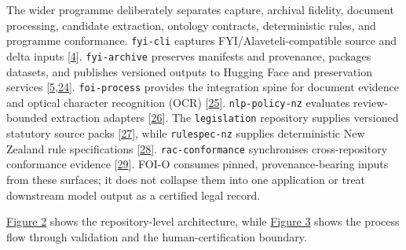 \documentclass[
]{article}
\begin{document}
The wider programme deliberately separates capture, archival fidelity,
document processing, candidate extraction, ontology contracts,
deterministic rules, and programme conformance. \texttt{fyi-cli}
captures FYI/Alaveteli-compatible source and delta inputs {[}\hyperlink{ref-4}{4}{]}.
\texttt{fyi-archive} preserves manifests and provenance, packages
datasets, and publishes versioned outputs to Hugging Face and
preservation services {[}\hyperlink{ref-5}{5},\hyperlink{ref-24}{24}{]}. \texttt{foi-process} provides the
integration spine for document evidence and optical character
recognition (OCR) {[}\hyperlink{ref-25}{25}{]}. \texttt{nlp-policy-nz} evaluates
review-bounded extraction adapters {[}\hyperlink{ref-26}{26}{]}. The \texttt{legislation}
repository supplies versioned statutory source packs {[}\hyperlink{ref-27}{27}{]}, while
\texttt{rulespec-nz} supplies deterministic New Zealand rule
specifications {[}\hyperlink{ref-28}{28}{]}. \texttt{rac-conformance} synchronises
cross-repository conformance evidence {[}\hyperlink{ref-29}{29}{]}. FOI-O consumes pinned,
provenance-bearing inputs from these surfaces; it does not collapse them
into one application or treat downstream model output as a certified
legal record.

\hyperlink{fig-repository-architecture}{Figure 2} shows the
repository-level architecture, while
\hyperlink{fig-process-architecture}{Figure 3} shows the process flow
through validation and the human-certification boundary.
\end{document}
